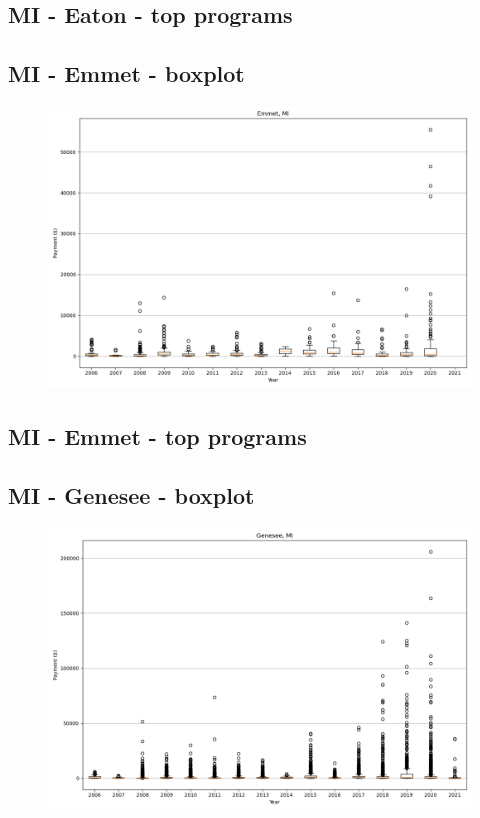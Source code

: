 \subsection*{MI - Eaton - top programs}

\newpage
\subsection*{MI - Emmet - boxplot}
\begin{figure}[h]
\centering
\includegraphics[width=7in]{../output/boxplots/counties/Emmet-MI_boxplot.png}
\end{figure}


\subsection*{MI - Emmet - top programs}

\newpage
\subsection*{MI - Genesee - boxplot}
\begin{figure}[h]
\centering
\includegraphics[width=7in]{../output/boxplots/counties/Genesee-MI_boxplot.png}
\end{figure}


